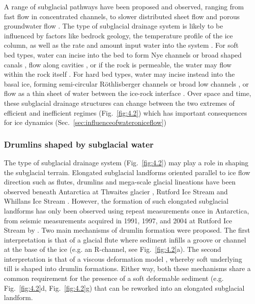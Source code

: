 A range of subglacial pathways have been proposed and observed, ranging from fast flow in concentrated channels, to slower distributed sheet flow and porous groundwater flow \citep[Fig. \ref{fig:4.2};][]{FlowersModellingwaterflow2015}.
The type of subglacial drainage system is likely to be influenced by factors like bedrock geology, the temperature profile of the ice column, as well as the rate and amount input water into the system \citep[see][for a review]{FlowersModellingwaterflow2015}.
For soft bed types, water can incise into the bed to form Nye channels \citep[Fig.~\ref{fig:4.2}c,][]{NyeWaterbedglacier1969} or broad shaped canals \citep[Fig.~\ref{fig:4.2}d,][]{NgCoupledicetill2000}, flow along cavities \citep[Fig.~\ref{fig:4.2}f,][]{LliboutryGeneralTheorySubglacial1968}, or if the rock is permeable, the water may flow within the rock itself \citep[Fig.~\ref{fig:4.2}g,][]{ShoemakerSubglacialHydrologyIce1986}.
For hard bed types, water may incise instead into the basal ice, forming semi-circular Röthlisberger channels \citep[Fig.~\ref{fig:4.2}a,][]{RothlisbergerWaterPressureIntra1972} or broad low channels \citep[Fig.~\ref{fig:4.2}b,][]{HookeSubglacialWaterPressures1990}, or flow as a thin sheet of water between the ice-rock interface \citep[Fig.~\ref{fig:4.2}e,][]{WeertmanSlidingGlaciers1957}.
Over space and time, these subglacial drainage structures can change between the two extremes of efficient and inefficient regimes (Fig.~\ref{fig:4.2}) which has important consequences for ice dynamics (Sec.~\ref{sec:influenceofwateroniceflow}) %

\subsubsection{Drumlins shaped by subglacial water}

The type of subglacial drainage system (Fig.~\ref{fig:4.2}) may play a role in shaping the subglacial terrain.
Elongated subglacial landforms oriented parallel to ice flow direction such as flutes, drumlins and mega-scale glacial lineations \citep[see][]{Elysubglacialbedformscomprise2016} have been observed beneath Antarctica at Thwaites glacier \citep{HolschuhLinkingpostglaciallandscapes2020}, Rutford Ice Stream \citep{KingSubglaciallandformsRutford2016} and Whillans Ice Stream \citep{RooneyTillicestream1987}.
However, the formation of such elongated subglacial landforms has only been observed using repeat measurements once in Antarctica, from seismic measurements acquired in 1991, 1997, and 2004 at Rutford Ice Stream by \citet{SmithRapiderosiondrumlin2007}.
Two main mechanisms of drumlin formation were proposed.
The first interpretation is that of a glacial flute \citep{BoultonOriginGlaciallyFluted1976} where sediment infills a groove or channel at the base of the ice (e.g. an R-channel, see Fig.~\ref{fig:4.2}a).
The second interpretation is that of a viscous deformation model \citep[e.g.][]{HindmarshDrumlinizationdrumlinforminginstabilities1998}, whereby soft underlying till is shaped into drumlin formations.
Either way, both these mechanisms share a common requirement for the presence of a soft deformable sediment (e.g. Fig.~\ref{fig:4.2}d, Fig.~\ref{fig:4.2}g) that can be reworked into an elongated subglacial landform.

